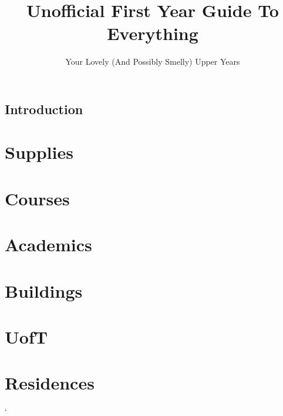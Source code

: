 \documentclass[12pt]{report}
\author{Your Lovely (And Possibly Smelly) Upper Years}
\title{Unofficial First Year Guide To Everything}
\begin{document}
\maketitle
\tableofcontents

\section{Introduction}

\chapter{Supplies}


\chapter{Courses}


\chapter{Academics}


\chapter{Buildings}


\chapter{UofT}


\chapter{Residences}`

\end{document}
